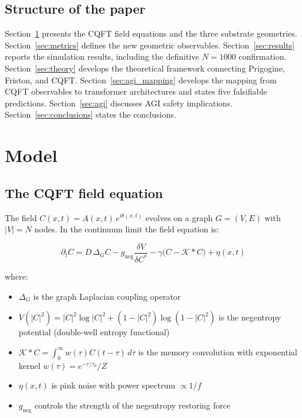 \documentclass[12pt,a4paper]{article}
\theoremstyle{plain}
\theoremstyle{definition}
\begin{document}
\subsection{Structure of the paper}

Section~\ref{sec:model} presents the CQFT field equations and the three
substrate geometries. Section~\ref{sec:metrics} defines the new geometric
observables. Section~\ref{sec:results} reports the simulation results,
including the definitive $N=1000$ confirmation.
Section~\ref{sec:theory} develops the theoretical framework connecting
Prigogine, Friston, and CQFT.
Section~\ref{sec:agi_mapping} develops the mapping from CQFT observables
to transformer architectures and states five falsifiable predictions.
Section~\ref{sec:agi} discusses AGI safety implications.
Section~\ref{sec:conclusions} states the conclusions.

\section{Model}
\label{sec:model}

\subsection{The CQFT field equation}

The field $C(x,t) = A(x,t)\,e^{i\theta(x,t)}$ evolves on a graph
$G = (V, E)$ with $|V| = N$ nodes. In the continuum limit the field
equation is:

\begin{equation}
\label{eq:field}
\partial_t C = D\,\Delta_G C
  - g_{\text{neg}}\frac{\delta V}{\delta C^*}
  - \gamma\bigl(C - \mathcal{K} * C\bigr)
  + \eta(x,t)
\end{equation}

where:
\begin{itemize}[noitemsep]
  \item $\Delta_G$ is the graph Laplacian coupling operator
  \item $V(|C|^2) = |C|^2\log|C|^2 + (1-|C|^2)\log(1-|C|^2)$ is the
    negentropy potential (double-well entropy functional)
  \item $\mathcal{K} * C = \int_0^\infty w(\tau)C(t-\tau)\,d\tau$ is the
    memory convolution with exponential kernel $w(\tau) = e^{-\tau/\tau_0}/Z$
  \item $\eta(x,t)$ is pink noise with power spectrum $\propto 1/f$
  \item $g_{\text{neg}}$ controls the strength of the negentropy restoring force
\end{itemize}
\end{document}
